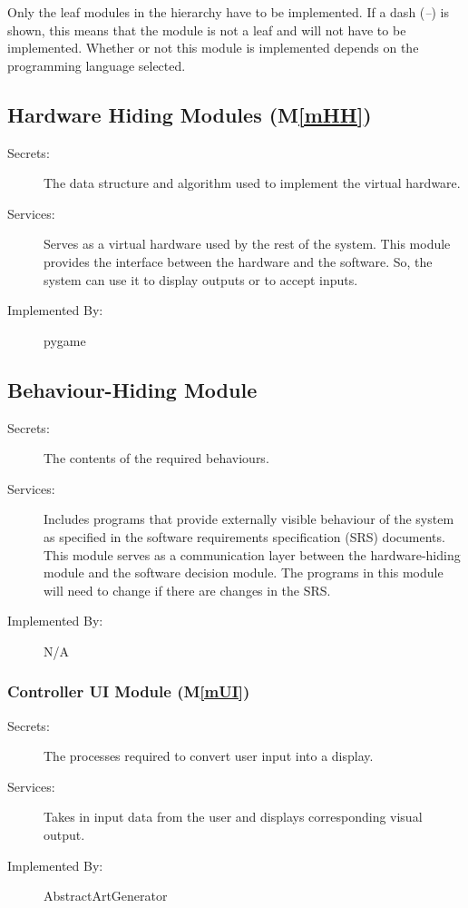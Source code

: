 \documentclass[12pt, titlepage]{article}
\newcommand{\mref}[1]{M\ref{#1}}
\begin{document}
Only the leaf modules in the
hierarchy have to be implemented. If a dash (\emph{--}) is shown, this means
that the module is not a leaf and will not have to be implemented. Whether or
not this module is implemented depends on the programming language
selected.

\subsection{Hardware Hiding Modules (\mref{mHH})}

\begin{description}
\item[Secrets:]The data structure and algorithm used to implement the virtual
  hardware.
\item[Services:]Serves as a virtual hardware used by the rest of the
  system. This module provides the interface between the hardware and the
  software. So, the system can use it to display outputs or to accept inputs.
\item[Implemented By:] pygame
\end{description}

\subsection{Behaviour-Hiding Module}

\begin{description}
\item[Secrets:]The contents of the required behaviours.
\item[Services:]Includes programs that provide externally visible behaviour of
  the system as specified in the software requirements specification (SRS)
  documents. This module serves as a communication layer between the
  hardware-hiding module and the software decision module. The programs in this
  module will need to change if there are changes in the SRS.
\item[Implemented By:] N/A
\end{description}

\subsubsection{Controller UI Module (\mref{mUI})}

\begin{description}
\item[Secrets:] The processes required to convert user input into a display.
\item[Services:] Takes in input data from the user and displays corresponding visual output.
\item[Implemented By:] AbstractArtGenerator
\end{description}
\end{document}
